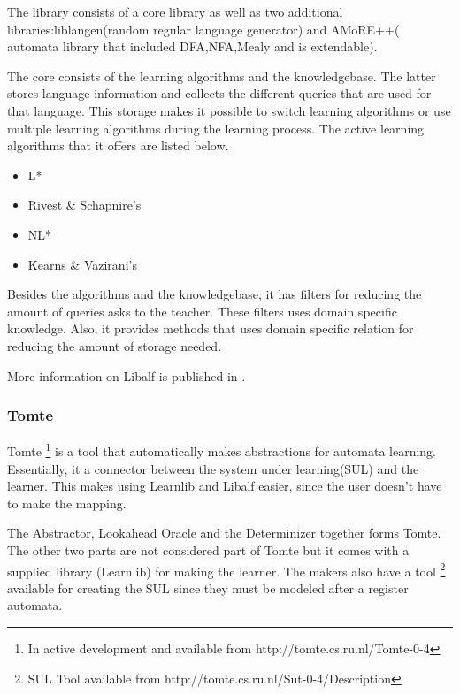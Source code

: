 \documentclass[multi,crop=false,class=article]{standalone}
\begin{document}
The library consists of a core library as well as two additional libraries:liblangen(random regular language generator) and AMoRE++(
automata library that included DFA,NFA,Mealy and is extendable).

The core consists of the learning algorithms and the knowledgebase. The latter
stores language information and collects the different queries that are used
for that language. This storage makes it possible to switch learning algorithms
or use multiple learning algorithms during the learning process. The active
learning algorithms that it offers are listed below.

\begin{itemize}
	\item L*
	\item Rivest \& Schapnire's
	\item NL*
	\item Kearns \& Vazirani's
\end{itemize}

Besides the algorithms and the knowledgebase, it has filters for reducing the
amount of queries asks to the teacher. These filters uses domain specific
knowledge. %
Also, it provides methods that uses domain specific relation for reducing the
amount of storage needed.

More information on Libalf is published in \cite{Bollig2010}.

\subsubsection{Tomte}
\label{sssec:tomte}
Tomte \footnote{In active development and available from
http://tomte.cs.ru.nl/Tomte-0-4} is a tool that automatically makes
abstractions for automata learning. Essentially, it a connector between the
system under learning(SUL) and the learner. This makes using Learnlib and
Libalf easier, since the user doesn't have to make the mapping.


The Abstractor, Lookahead Oracle and the Determinizer together forms Tomte. The
other two parts are not considered part
of Tomte but it comes with a supplied library (Learnlib) for making the learner.
The makers also have a tool \footnote{SUL Tool available from
http://tomte.cs.ru.nl/Sut-0-4/Description} available for creating the SUL since
they must be modeled after a register automata.
\end{document}
